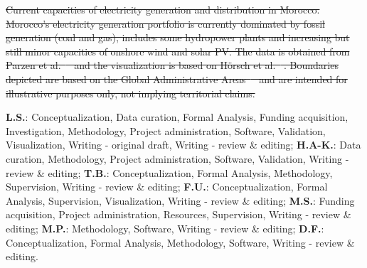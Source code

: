 \documentclass[5p,numafflabel]{elsarticle}
\providecommand{\DIFdeltex}[1]{{\protect\color{red}\sout{#1}}}                      %
\providecommand{\DIFdelend}{} %
\providecommand{\DIFdelFL}[1]{\DIFdel{#1}} %
\providecommand{\DIFdel}[1]{\texorpdfstring{\DIFdeltex{#1}}{}} %
\DeclareRobustCommand{\DIFdelend}{\DIFOaddend \let\includegraphics\DIFOincludegraphics} %
\begin{document}
{%
\DIFdelFL{Current capacities of electricity generation and distribution in Morocco. Morocco's electricity generation portfolio is currently dominated by fossil generation (coal and gas), includes some hydropower plants and increasing but still minor capacities of onshore wind and solar PV. The data is obtained from Parzen et al.\mbox{%
\cite{Parzen2023} }\hspace{0pt}%
and the visualization is based on H\"orsch et al.\mbox{%
\cite{Horsch2018}}\hspace{0pt}%
. Boundaries depicted are based on the Global Administrative Areas\mbox{%
\cite{gadm2022} }\hspace{0pt}%
and are intended for illustrative purposes only, not implying territorial claims.
    }}

\DIFdelend \textbf{L.S.}:
Conceptualization,
Data curation,
Formal Analysis,
Funding acquisition,
Investigation,
Methodology,
Project administration,
Software,
Validation,
Visualization,
Writing - original draft,
Writing - review \& editing;
\textbf{H.A-K.}:
Data curation,
Methodology,
Project administration,
Software,
Validation,
Writing - review \& editing;
\textbf{T.B.}:
Conceptualization,
Formal Analysis,
Methodology,
Supervision,
Writing - review \& editing;
\textbf{F.U.}:
Conceptualization,
Formal Analysis,
Supervision,
Visualization,
Writing - review \& editing;
\textbf{M.S.}:
Funding acquisition,
Project administration,
Resources,
Supervision,
Writing - review \& editing;
\textbf{M.P.}:
Methodology,
Software,
Writing - review \& editing;
\textbf{D.F.}:
Conceptualization,
Formal Analysis,
Methodology,
Software,
Writing - review \& editing.
\end{document}

